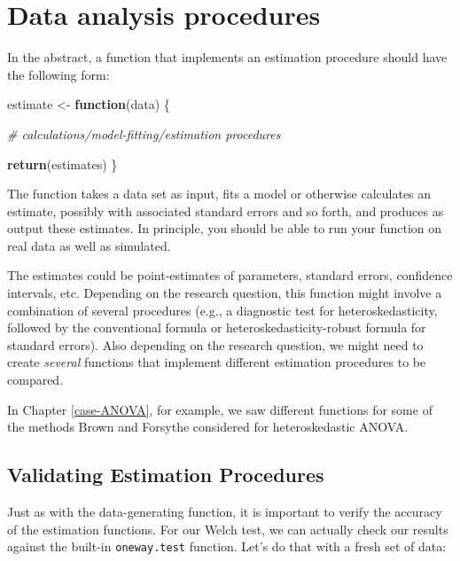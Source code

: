 \documentclass[
]{book}
\newenvironment{Shaded}{\begin{snugshade}}{\end{snugshade}}
\newcommand{\CommentTok}[1]{\textcolor[rgb]{0.56,0.35,0.01}{\textit{#1}}}
\newcommand{\ControlFlowTok}[1]{\textcolor[rgb]{0.13,0.29,0.53}{\textbf{#1}}}
\newcommand{\FunctionTok}[1]{\textcolor[rgb]{0.13,0.29,0.53}{\textbf{#1}}}
\newcommand{\NormalTok}[1]{#1}
\newcommand{\OtherTok}[1]{\textcolor[rgb]{0.56,0.35,0.01}{#1}}
\begin{document}
\chapter{Data analysis procedures}\label{data-analysis-procedures}

In the abstract, a function that implements an estimation procedure should have the following form:

\begin{Shaded}
\begin{Highlighting}[]
\NormalTok{estimate }\OtherTok{\textless{}{-}} \ControlFlowTok{function}\NormalTok{(data) \{}

  \CommentTok{\# calculations/model{-}fitting/estimation procedures}
  
  \FunctionTok{return}\NormalTok{(estimates)}
\NormalTok{\}}
\end{Highlighting}
\end{Shaded}

The function takes a data set as input, fits a model or otherwise calculates an estimate, possibly with associated standard errors and so forth, and produces as output these estimates.
In principle, you should be able to run your function on real data as well as simulated.

The estimates could be point-estimates of parameters, standard errors, confidence intervals, etc.
Depending on the research question, this function might involve a combination of several procedures (e.g., a diagnostic test for heteroskedasticity, followed by the conventional formula or heteroskedasticity-robust formula for standard errors).
Also depending on the research question, we might need to create \emph{several} functions that implement different estimation procedures to be compared.

In Chapter \ref{case-ANOVA}, for example, we saw different functions for some of the methods Brown and Forsythe considered for heteroskedastic ANOVA.

\section{Validating Estimation Procedures}\label{validating-estimation-procedures}

Just as with the data-generating function, it is important to verify the accuracy of the estimation functions.
For our Welch test, we can actually check our results against the built-in \texttt{oneway.test} function. Let's do that with a fresh set of data:
\end{document}
